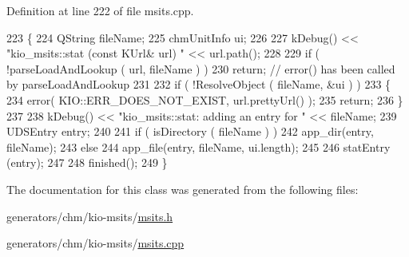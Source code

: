 Definition at line 222 of file msits.\+cpp.


\begin{DoxyCode}
223 \{
224     QString fileName;
225     chmUnitInfo ui;
226 
227     kDebug() << \textcolor{stringliteral}{"kio\_msits::stat (const KUrl& url) "} << url.path();
228 
229     \textcolor{keywordflow}{if} ( !parseLoadAndLookup ( url, fileName ) )
230         \textcolor{keywordflow}{return}; \textcolor{comment}{// error() has been called by parseLoadAndLookup}
231 
232     \textcolor{keywordflow}{if} ( !ResolveObject ( fileName, &ui ) )
233     \{
234         error( KIO::ERR\_DOES\_NOT\_EXIST, url.prettyUrl() );
235         \textcolor{keywordflow}{return};
236     \}
237 
238     kDebug() << \textcolor{stringliteral}{"kio\_msits::stat: adding an entry for "} << fileName;
239     UDSEntry entry;
240 
241     \textcolor{keywordflow}{if} ( isDirectory ( fileName ) )
242         app\_dir(entry, fileName);
243     \textcolor{keywordflow}{else}
244         app\_file(entry, fileName, ui.length);
245  
246     statEntry (entry);
247 
248     finished();
249 \}
\end{DoxyCode}


The documentation for this class was generated from the following files\+:\begin{DoxyCompactItemize}
\item 
generators/chm/kio-\/msits/\hyperlink{msits_8h}{msits.\+h}\item 
generators/chm/kio-\/msits/\hyperlink{msits_8cpp}{msits.\+cpp}\end{DoxyCompactItemize}
